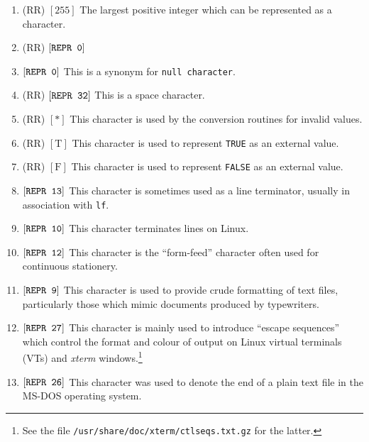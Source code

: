 \begin{enumerate}
\item {}
(RR) $[255]$ \newline
The largest positive integer which can be represented as a character.
\item {}
(RR) $[\mbox{\texttt{REPR 0}}]$
\item {}
$[\mbox{\texttt{REPR 0}}]$ \newline
This is a synonym for \verb|null character|.
\item {}
(RR) $[\mbox{\texttt{REPR 32}}]$ \newline
This is a space character.
\item {}
(RR) $[\ast]$ \newline
This character is used by the conversion routines for invalid values.
\item {} (RR) $[\mbox{T}]$
\newline
This character is used to represent \verb|TRUE| as an external value.
\item {} (RR) $[\mbox{F}]$
\newline
This character is used to represent \verb|FALSE| as an external value.
\item {}
$[\mbox{\texttt{REPR 13}}]$ \newline
This character is sometimes used as a line terminator, usually in
association with \verb|lf|.
\item {}
$[\mbox{\texttt{REPR 10}}]$  \newline
This character terminates lines on Linux.
\item {}
$[\mbox{\texttt{REPR 12}}]$ \newline
This character is the ``form-feed'' character often used for
continuous stationery.
\item {}
$[\mbox{\texttt{REPR 9}}]$ \newline
This character is used to provide crude formatting of text files,
particularly those which mimic documents produced by typewriters.

\item {}
$[\mbox{\texttt{REPR 27}}]$ \newline
This character is mainly used to introduce ``escape sequences'' which
control the format and colour of output on Linux virtual terminals
(VTs) and \textit{xterm} windows.\footnote{See the file
\texttt{/usr/share/doc/xterm/ctlseqs.txt.gz} for the latter.}
\item {}
$[\mbox{\texttt{REPR 26}}]$ \newline
This character was used to denote the end of a plain text file in the
MS-DOS operating system.
\end{enumerate}

